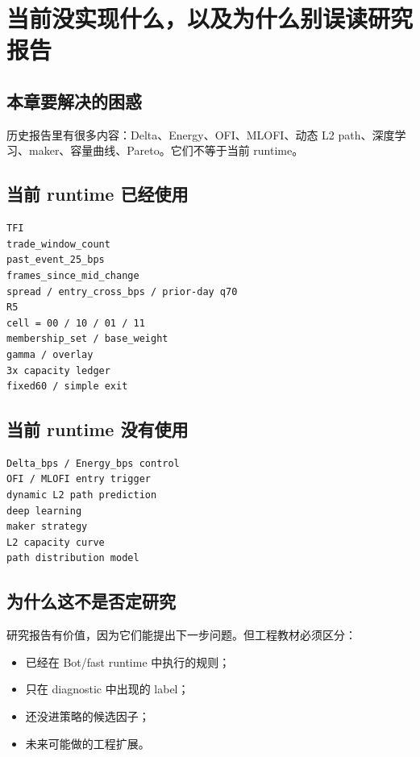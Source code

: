 \chapter{当前没实现什么，以及为什么别误读研究报告}

\section{本章要解决的困惑}

历史报告里有很多内容：Delta、Energy、OFI、MLOFI、动态 L2 path、深度学习、maker、容量曲线、Pareto。它们不等于当前 runtime。

\section{当前 runtime 已经使用}

\begin{lstlisting}
TFI
trade_window_count
past_event_25_bps
frames_since_mid_change
spread / entry_cross_bps / prior-day q70
R5
cell = 00 / 10 / 01 / 11
membership_set / base_weight
gamma / overlay
3x capacity ledger
fixed60 / simple exit
\end{lstlisting}

\section{当前 runtime 没有使用}

\begin{lstlisting}
Delta_bps / Energy_bps control
OFI / MLOFI entry trigger
dynamic L2 path prediction
deep learning
maker strategy
L2 capacity curve
path distribution model
\end{lstlisting}


\section{为什么这不是否定研究}

研究报告有价值，因为它们能提出下一步问题。但工程教材必须区分：

\begin{itemize}[leftmargin=2em]
  \item 已经在 Bot/fast runtime 中执行的规则；
  \item 只在 diagnostic 中出现的 label；
  \item 还没进策略的候选因子；
  \item 未来可能做的工程扩展。
\end{itemize}

